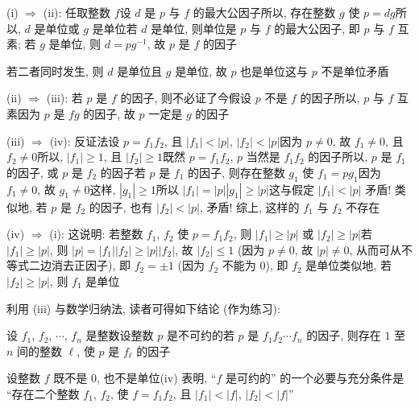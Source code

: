 \begin{pf}
    (i) $\Rightarrow$ (ii): 任取整数 $f$\period 设 $d$ 是 $p$ 与 $f$ 的最大公因子\period 所以, 存在整数 $g$ 使 $p = dg$\period 所以, $d$ 是单位或 $g$ 是单位\period 若 $d$ 是单位, 则单位是 $p$ 与 $f$ 的最大公因子, 即 $p$ 与 $f$ 互素; 若 $g$ 是单位, 则 $d = p g^{-1}$, 故 $p$ 是 $f$ 的因子\period

    若二者同时发生, 则 $d$ 是单位且 $g$ 是单位, 故 $p$ 也是单位\period 这与 $p$ 不是单位矛盾\period

    (ii) $\Rightarrow$ (iii): 若 $p$ 是 $f$ 的因子, 则不必证了\period 今假设 $p$ 不是 $f$ 的因子\period 所以, $p$ 与 $f$ 互素\period 因为 $p$ 是 $fg$ 的因子, 故 $p$ 一定是 $g$ 的因子\period

    (iii) $\Rightarrow$ (iv): 反证法\period 设 $p = f_1 f_2$, 且 $|f_1| < |p|$, $|f_2| < |p|$\period 因为 $p \neq 0$, 故 $f_1 \neq 0$, 且 $f_2 \neq 0$\period 所以, $|f_1| \geq 1$, 且 $|f_2| \geq 1$\period 既然 $p = f_1 f_2$, $p$ 当然是 $f_1 f_2$ 的因子\period 所以, $p$ 是 $f_1$ 的因子, 或 $p$ 是 $f_2$ 的因子\period 若 $p$ 是 $f_1$ 的因子, 则存在整数 $g_1$ 使 $f_1 = pg_1$\period 因为 $f_1 \neq 0$, 故 $g_1 \neq 0$\period 这样, $|g_1| \geq 1$\period 所以 $|f_1| = |p| |g_1| \geq |p|$\period 这与假定 $|f_1| < |p|$ 矛盾! 类似地, 若 $p$ 是 $f_2$ 的因子, 也有 $|f_2| < |p|$, 矛盾! 综上, 这样的 $f_1$ 与 $f_2$ 不存在\period

    (iv) $\Rightarrow$ (i): 这说明: 若整数 $f_1$, $f_2$ 使 $p = f_1 f_2$, 则 $|f_1| \geq |p|$ 或 $|f_2| \geq |p|$\period 若 $|f_1| \geq |p|$, 则 $|p| = |f_1| |f_2| \geq |p| |f_2|$, 故 $|f_2| \leq 1$ (因为 $p \neq 0$, 故 $|p| \neq 0$, 从而可从不等式二边消去正因子), 即 $f_2 = \pm 1$ (因为 $f_2$ 不能为 $0$), 即 $f_2$ 是单位\period 类似地, 若 $|f_2| \geq |p|$, 则 $f_1$ 是单位\period
\end{pf}

\begin{remark}
    利用 (iii) 与数学归纳法, 读者可得如下结论 (作为练习):

    设 $f_1$, $f_2$, $\cdots$, $f_n$ 是整数\period 设整数 $p$ 是不可约的\period 若 $p$ 是 $f_1 f_2 \cdots f_n$ 的因子, 则存在 $1$ 至 $n$ 间的整数 $\ell$, 使 $p$ 是 $f_{\ell}$ 的因子\period
\end{remark}

\begin{remark}
    设整数 $f$ 既不是 $0$, 也不是单位\period (iv) 表明, ``$f$ 是可约的'' 的一个必要与充分条件是 ``存在二个整数 $f_1$, $f_2$, 使 $f = f_1 f_2$, 且 $|f_1| < |f|$, $|f_2| < |f|$''\period
\end{remark}

